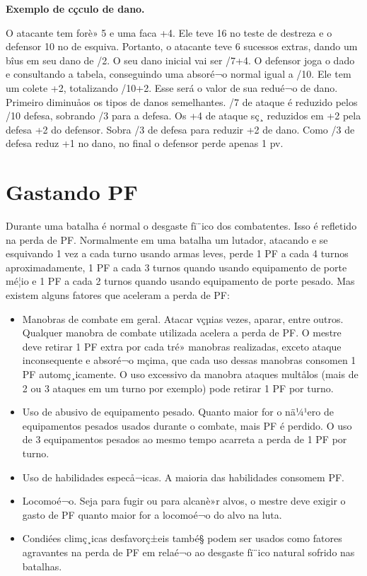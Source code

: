 \textbf{Exemplo de cçculo de dano.}
	
O atacante tem forè» 5 e uma faca +4. Ele teve 16 no teste de destreza e o defensor 10 no de esquiva. Portanto, o atacante teve 6 sucessos extras, dando um bîus em seu dano de /2. O seu dano inicial vai ser /7+4. O defensor joga o dado e consultando a tabela, conseguindo uma absoré¬o normal igual a /10.  Ele tem um colete +2, totalizando /10+2. Esse será o valor de sua redué¬o de dano. Primeiro diminuåos os tipos de danos semelhantes. /7 de ataque é reduzido pelos /10 defesa, sobrando /3 para a defesa. Os +4 de ataque sç¸ reduzidos em +2 pela defesa +2 do defensor. Sobra /3 de defesa para reduzir +2 de dano. Como /3 de defesa reduz +1 no dano, no final o defensor perde apenas 1 pv.


\section{Gastando PF}

Durante uma batalha é normal o desgaste fï¨ico dos combatentes. Isso é refletido na perda de PF. Normalmente em uma batalha um lutador, atacando e se esquivando 1 vez a cada turno usando armas leves, perde 1 PF a cada 4 turnos aproximadamente, 1 PF a cada 3 turnos quando usando equipamento de porte mé¦io e 1 PF a cada 2 turnos quando usando equipamento de porte pesado. Mas existem alguns fatores que aceleram a perda de PF:

\begin{itemize}
	\item Manobras de combate em geral. Atacar vçµias vezes, aparar, entre outros. Qualquer manobra de combate utilizada acelera a perda de PF. O mestre deve retirar 1 PF extra por cada tré» manobras realizadas, exceto ataque inconsequente e absoré¬o mçima, que cada uso dessas manobras consomen 1 PF automç¸icamente. O uso excessivo da manobra ataques multålos (mais de 2 ou 3 ataques em um turno por exemplo) pode retirar 1 PF por turno. 

	\item Uso de abusivo de equipamento pesado. Quanto maior for o nä¼¹ero de equipamentos pesados usados durante o combate, mais PF é perdido. O uso de 3 equipamentos pesados ao  mesmo tempo acarreta a perda de 1 PF por turno. 
	\item Uso de habilidades especå¬icas. A maioria das habilidades consomem PF.

	\item Locomoé¬o. Seja para fugir ou para alcanè»r alvos, o mestre deve exigir o gasto de PF quanto maior for a locomoé¬o do alvo na luta.

	\item Condiées climç¸icas desfavorç±eis també§ podem ser usados como fatores agravantes na perda de PF em relaé¬o ao desgaste fï¨ico natural sofrido nas batalhas.
\end{itemize}

